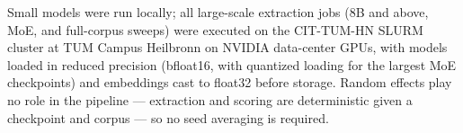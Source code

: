 Small models were run locally; all large-scale extraction jobs (8B and
above, MoE, and full-corpus sweeps) were executed on the CIT-TUM-HN
SLURM cluster at TUM Campus Heilbronn on NVIDIA data-center GPUs, with
models loaded in reduced precision (bfloat16, with quantized loading for
the largest MoE checkpoints) and embeddings cast to float32 before
storage. Random effects play no role in the pipeline --- extraction and
scoring are deterministic given a checkpoint and corpus --- so no seed
averaging is required.
